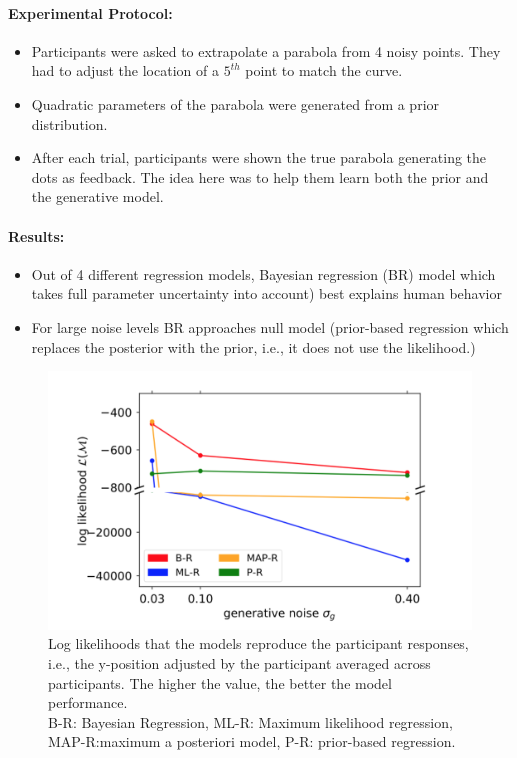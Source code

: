 \documentclass[main]{subfiles}
\begin{document}
\paragraph{Experimental Protocol:}
\begin{itemize}
    \item Participants were asked to extrapolate a parabola from 4 noisy points. They had to adjust the location of a $5^{th}$ point to match the curve.  
    \item Quadratic parameters of the parabola were generated from a prior distribution.
    \item After each trial, participants were shown the true parabola generating the dots as feedback. The idea here was to help them learn both the prior and the generative model.
    
\end{itemize}

\paragraph{Results:} 
\begin{itemize}
    \item Out of 4 different regression models, Bayesian regression (BR) model which takes full parameter uncertainty into account) best explains human behavior
    \item For large noise levels BR approaches null model (prior-based regression which replaces the posterior with the prior, i.e., it does not use the likelihood.)
\end{itemize}
 \begin{figure}[H]
    	\centering
    	\includegraphics[width=0.9\linewidth]{05_LearningAsBayesianInference/figures/human_behavorial_exp.png}
    	\caption{Log likelihoods that the models reproduce the participant responses, i.e., the y-position adjusted by the participant averaged across participants. The higher the value, the better the model performance.\\ B-R: Bayesian Regression, ML-R: Maximum likelihood regression, MAP-R:maximum a posteriori model, P-R: prior-based regression.} 
    	\label{fig:experiment}
    \end{figure}
\end{document}
